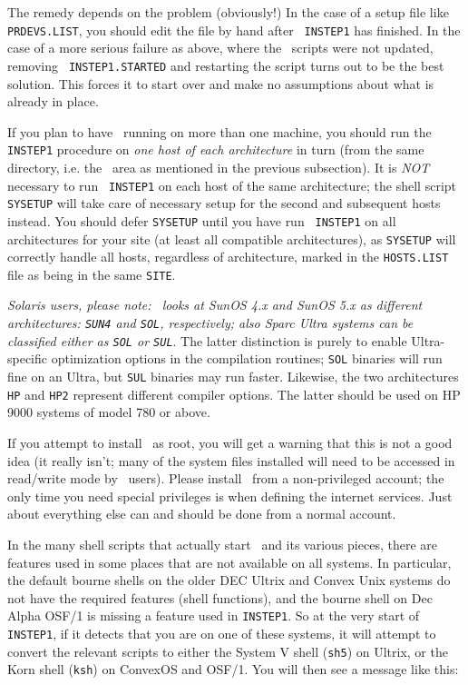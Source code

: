 The remedy depends on the problem (obviously!)  In the case of a setup
file like {\tt PRDEVS.LIST}, you should edit the file by hand after {\tt
INSTEP1} has finished.  In the case of a more serious failure as above,
where the \AROOT\ scripts were not updated, removing {\tt
INSTEP1.STARTED} and restarting the script turns out to be the best
solution.  This forces it to start over and make no assumptions about
what is already in place.


If you plan to have \AIPS\ running on more than one machine, you should
run the {\tt INSTEP1} procedure on {\it one host of each architecture\/}
in turn (from the same directory, i.e.  the \AROOT\ area as mentioned in
the previous subsection).  It is {\it NOT\/} necessary to run {\tt
INSTEP1} on each host of the same architecture; the shell script {\tt
SYSETUP} will take care of necessary setup for the second and subsequent
hosts instead.  You should defer {\tt SYSETUP} until you have run {\tt
INSTEP1} on all architectures for your site (at least all compatible
architectures), as {\tt SYSETUP} will correctly handle all hosts,
regardless of architecture, marked in the {\tt HOSTS.LIST} file as being
in the same {\tt SITE}.

{\it Solaris users, please note: \AIPS\ looks at SunOS 4.x and SunOS 5.x
as different architectures:\/ {\tt SUN4} and\/ {\tt SOL}, respectively;
also Sparc Ultra systems can be classified either as\/ {\tt SOL} or\/
{\tt SUL}}.  The latter distinction is purely to enable Ultra-specific
optimization options in the compilation routines; {\tt SOL} binaries
will run fine on an Ultra, but {\tt SUL} binaries may run faster.
Likewise, the two architectures {\tt HP} and {\tt HP2} represent
different compiler options.  The latter should be used on HP 9000
systems of model 780 or above.

If you attempt to install \AIPS\ as root, you will get a warning that
this is not a good idea (it really isn't; many of the system files
installed will need to be accessed in read/write mode by \AIPS\ users).
Please install \AIPS\ from a non-privileged account; the only time you
need special privileges is when defining the internet services.  Just
about everything else can and should be done from a normal account.

\medskip{}

In the many shell scripts that actually start \AIPS\ and its various
pieces, there are features used in some places that are not available on
all systems.  In particular, the default bourne shells on the older DEC
Ultrix and Convex Unix systems do not have the required features (shell
functions), and the bourne shell on Dec Alpha OSF/1 is missing a feature
used in {\tt INSTEP1}.  So at the very start of {\tt INSTEP1}, if it
detects that you are on one of these systems, it will attempt to convert
the relevant scripts to either the System V shell ({\tt sh5}) on Ultrix,
or the Korn shell ({\tt ksh}) on ConvexOS and OSF/1.  You will then see
a message like this:\medskip

